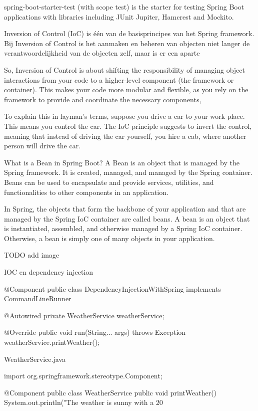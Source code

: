 spring-boot-starter-test (with scope test) is the starter for testing Spring Boot applications with libraries including JUnit Jupiter, Hamcrest and Mockito.

Inversion of Control (IoC) is \'e\'en van de basisprincipes van het Spring framework.
Bij Inversion of Control is het aanmaken en beheren van objecten niet langer de verantwoordelijkheid van de objecten zelf, maar is er een aparte 

So, Inversion of Control is about shifting the responsibility of managing object interactions from your code to a higher-level component (the framework or container). This makes your code more modular and flexible, as you rely on the framework to provide and coordinate the necessary components, 

To explain this in layman's terms, suppose you drive a car to your work place. This means you control the car. The IoC principle suggests to invert the control, meaning that instead of driving the car yourself, you hire a cab, where another person will drive the car.

What is a Bean in Spring Boot? A Bean is an object that is managed by the Spring framework. It is created, managed, and managed by the Spring container. Beans can be used to encapsulate and provide services, utilities, and functionalities to other components in an application.

In Spring, the objects that form the backbone of your application and that are managed by the Spring IoC container are called beans. A bean is an object that is instantiated, assembled, and otherwise managed by a Spring IoC container. Otherwise, a bean is simply one of many objects in your application.

TODO add image





IOC en dependency injection 


@Component
public class DependencyInjectionWithSpring implements CommandLineRunner {
   
   @Autowired
   private WeatherService weatherService;
   
   @Override    
   public void run(String... args) throws Exception {
	   weatherService.printWeather();
   }
}

WeatherService.java

import org.springframework.stereotype.Component;

@Component
public class WeatherService {
   public void printWeather() {
      System.out.println("The weather is sunny with a 20%
   }
}


